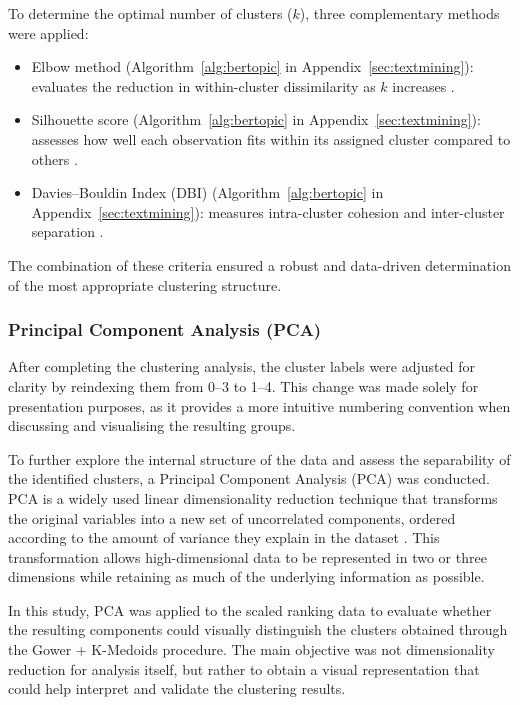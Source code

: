 \documentclass[a4paper, 12pt, twoside]{report}  %
\begin{document}
\indent To determine the optimal number of clusters ($k$), three complementary methods were applied:

\begin{itemize}
    \item Elbow method (Algorithm~\ref{alg:bertopic} in Appendix~\ref{sec:textmining}): evaluates the reduction in within-cluster dissimilarity as $k$ increases \cite{elbow}.
    \item Silhouette score (Algorithm~\ref{alg:bertopic} in Appendix~\ref{sec:textmining}): assesses how well each observation fits within its assigned cluster compared to others \cite{Rousseeuw1987}.
    \item Davies–Bouldin Index (DBI) (Algorithm~\ref{alg:bertopic} in Appendix~\ref{sec:textmining}): measures intra-cluster cohesion and inter-cluster separation \cite{DaviesBouldin1979}.
\end{itemize}

The combination of these criteria ensured a robust and data-driven determination of the most appropriate clustering structure.

\subsubsection{Principal Component Analysis (PCA)}

\indent After completing the clustering analysis, the cluster labels were adjusted for clarity by reindexing them from 0–3 to 1–4. This change was made solely for presentation purposes, as it provides a more intuitive numbering convention when discussing and visualising the resulting groups.

\indent To further explore the internal structure of the data and assess the separability of the identified clusters, a Principal Component Analysis (PCA) was conducted. PCA is a widely used linear dimensionality reduction technique that transforms the original variables into a new set of uncorrelated components, ordered according to the amount of variance they explain in the dataset \cite{Jolliffe2002}. This transformation allows high-dimensional data to be represented in two or three dimensions while retaining as much of the underlying information as possible.

\indent In this study, PCA was applied to the scaled ranking data to evaluate whether the resulting components could visually distinguish the clusters obtained through the Gower + K-Medoids procedure. The main objective was not dimensionality reduction for analysis itself, but rather to obtain a visual representation that could help interpret and validate the clustering results.
\end{document}
